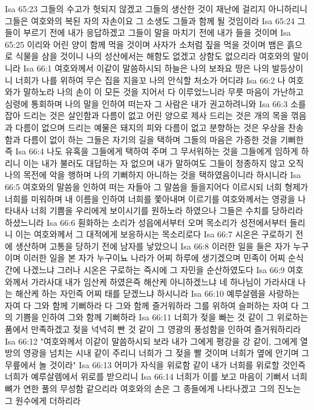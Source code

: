 Isa 65:23  그들의 수고가 헛되지 않겠고 그들의 생산한 것이 재난에 걸리지 아니하리니 그들은 여호와의 복된 자의 자손이요 그 소생도 그들과 함께 될 것임이라
Isa 65:24  그들이 부르기 전에 내가 응답하겠고 그들이 말을 마치기 전에 내가 들을 것이며
Isa 65:25  이리와 어린 양이 함께 먹을 것이며 사자가 소처럼 짚을 먹을 것이며 뱀은 흙으로 식물을 삼을 것이니 나의 성산에서는 해함도 없겠고 상함도 없으리라 여호와의 말이니라
Isa 66:1  여호와께서 이같이 말씀하시되 하늘은 나의 보좌요 땅은 나의 발등상이니 너희가 나를 위하여 무슨 집을 지을꼬 나의 안식할 처소가 어디랴
Isa 66:2  나 여호와가 말하노라 나의 손이 이 모든 것을 지어서 다 이루었느니라 무릇 마음이 가난하고 심령에 통회하며 나의 말을 인하여 떠는자 그 사람은 내가 권고하려니와
Isa 66:3  소를 잡아 드리는 것은 살인함과 다름이 없고 어린 양으로 제사 드리는 것은 개의 목을 꺾음과 다름이 없으며 드리는 예물은 돼지의 피와 다름이 없고 분향하는 것은 우상을 찬송함과 다름이 없이 하는 그들은 자기의 길을 택하며 그들의 마음은 가증한 것을 기뻐한즉
Isa 66:4  나도 유혹을 그들에게 택하여 주며 그 무서워하는 것을 그들에게 임하게 하리니 이는 내가 불러도 대답하는 자 없으며 내가 말하여도 그들이 청종하지 않고 오직 나의 목전에 악을 행하며 나의 기뻐하지 아니하는 것을 택하였음이니라 하시니라
Isa 66:5  여호와의 말씀을 인하여 떠는 자들아 그 말씀을 들을지어다 이르시되 너희 형제가 너희를 미워하며 내 이름을 인하여 너희를 쫓아내며 이르기를 여호와께서는 영광을 나타내사 너희 기쁨을 우리에게 보이시기를 원하노라 하였으나 그들은 수치를 당하리라 하셨느니라
Isa 66:6  훤화하는 소리가 성읍에서부터 오며 목소리가 성전에서부터 들리니 이는 여호와께서 그 대적에게 보응하시는 목소리로다
Isa 66:7  시온은 구로하기 전에 생산하며 고통을 당하기 전에 남자를 낳았으니
Isa 66:8  이러한 일을 들은 자가 누구이며 이러한 일을 본 자가 누구이뇨 나라가 어찌 하루에 생기겠으며 민족이 어찌 순식간에 나겠느냐 그러나 시온은 구로하는 즉시에 그 자민을 순산하였도다
Isa 66:9  여호와께서 가라사대 내가 임산케 하였은즉 해산케 아니하겠느냐 네 하나님이 가라사대 나는 해산케 하는 자인즉 어찌 태를 닫겠느냐 하시니라
Isa 66:10  예루살렘을 사랑하는 자여 다 그와 함께 기뻐하라 다 그와 함께 즐거워하라 그를 위하여 슬퍼하는 자여 다 그의 기쁨을 인하여 그와 함께 기뻐하라
Isa 66:11  너희가 젖을 빠는 것 같이 그 위로하는 품에서 만족하겠고 젖을 넉넉히 빤 것 같이 그 영광의 풍성함을 인하여 즐거워하리라
Isa 66:12  "여호와께서 이같이 말씀하시되 보라 내가 그에게 평강을 강 같이, 그에게 열방의 영광을 넘치는 시내 같이 주리니 너희가 그 젖을 빨 것이며 너희가 옆에 안기며 그 무릎에서 놀 것이라"
Isa 66:13  어미가 자식을 위로함 같이 내가 너희를 위로할 것인즉 너희가 예루살렘에서 위로를 받으리니
Isa 66:14  너희가 이를 보고 마음이 기뻐서 너희 뼈가 연한 풀의 무성함 같으리라 여호와의 손은 그 종들에게 나타나겠고 그의 진노는 그 원수에게 더하리라
